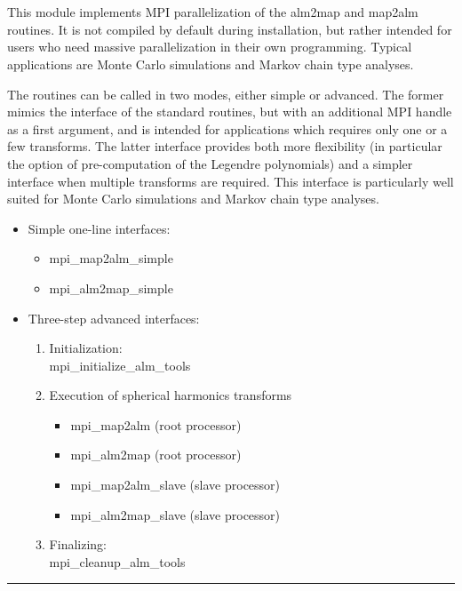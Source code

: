 
\sloppy


 \section[mpi\_alm\_tools*]{ }
\label{sub:mpi_alm_tools}
\author{Hans K. Eriksen}

\begin{facility}
{This module implements MPI parallelization of the alm2map and map2alm routines. 
It is not compiled by default during installation, but rather intended for
users who need massive parallelization in their own programming. Typical
applications are Monte Carlo simulations and Markov chain type
analyses.

The routines can be called in two modes, either simple or
advanced. The former mimics the interface of the standard routines,
but with an additional MPI handle as a first argument, and is intended
for applications which requires only one or a few transforms. The
latter interface provides both more flexibility (in particular the
option of pre-computation of the Legendre polynomials) and a simpler
interface when multiple transforms are required. This interface is
particularly well suited for Monte Carlo simulations and Markov chain
type analyses.  } 
{\modMpiAlmTools}
\end{facility}

\begin{example}
{ 
\begin{itemize}

\item Simple one-line interfaces:
\begin{itemize}
\item mpi\_map2alm\_simple
\item mpi\_alm2map\_simple
\end{itemize}

\item Three-step advanced interfaces:
\begin{enumerate}
   \item Initialization: \\mpi\_initialize\_alm\_tools
   \item Execution of spherical harmonics transforms
   \begin{itemize}
	   \item mpi\_map2alm (root processor)
	   \item mpi\_alm2map (root processor)
	   \item mpi\_map2alm\_slave (slave processor)
	   \item mpi\_alm2map\_slave (slave processor)
    \end{itemize}
    \item Finalizing: \\ mpi\_cleanup\_alm\_tools
\end{enumerate}
\end{itemize}
}
{
}
\end{example}

\rule{\hsize}{2mm}

\newpage
